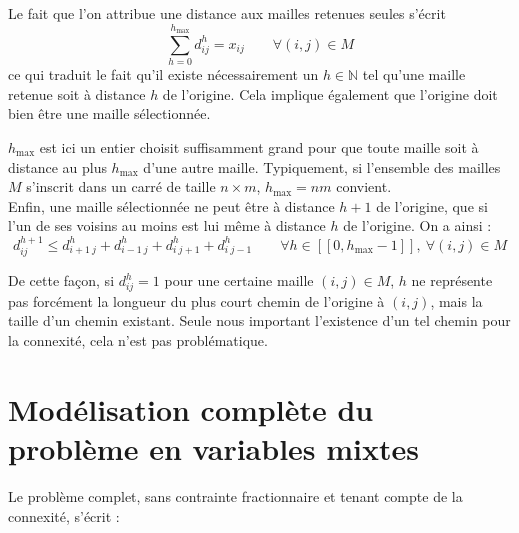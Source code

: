 \documentclass[a4paper,11pt]{article}
\begin{document}
Le fait que l'on attribue une distance aux mailles retenues seules s'écrit
\begin{equation}
\sum_{h=0}^{h_{\max}} d^h_{ij} = x_{ij} \qquad \forall (i,j) \in M
\end{equation}
ce qui traduit le fait qu'il existe nécessairement un $h \in \mathbb{N}$ tel qu'une maille retenue soit à distance $h$ de l'origine. Cela implique également que l'origine doit bien être une maille sélectionnée.

$h_{\max}$ est ici un entier choisit suffisamment grand pour que toute maille soit à distance au plus $h_{\max}$ d'une autre maille. Typiquement, si l'ensemble des mailles $M$ s'inscrit dans un carré de taille $n\times m$, $h_{\max} = n m$ convient.\\


Enfin, une maille sélectionnée ne peut être à distance $h+1$ de l'origine, que si l'un de ses voisins au moins est lui même à distance $h$ de l'origine. On a ainsi :
\begin{equation}
d^{h+1}_{ij} \le d^h_{i+1~j} + d^h_{i-1~j} + d^h_{i~j+1} + d^h_{i~j-1} \qquad \forall h \in [\![ 0, h_{\max}-1 ]\!],~ \forall (i,j) \in M
\end{equation}



De cette façon, si $d^h_{ij} = 1$ pour une certaine maille $(i,j) \in M$, $h$ ne représente pas forcément la longueur du plus court chemin de l'origine à $(i,j)$, mais la taille d'un chemin existant. Seule nous important l'existence d'un tel chemin pour la connexité, cela n'est pas problématique.

\newpage
\section{Modélisation complète du problème en variables mixtes}



Le problème complet, sans contrainte fractionnaire et tenant compte de la connexité, s'écrit :
\end{document}
